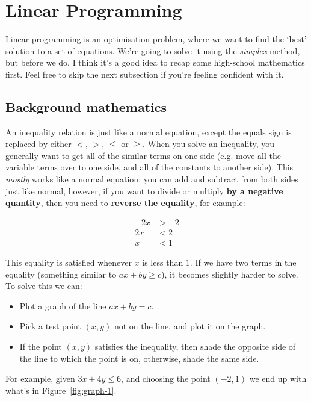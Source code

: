 \section{Linear Programming}

Linear programming is an optimisation problem, where we want to find the `best'
solution to a set of equations. We're going to solve it using the
\textit{simplex} method, but before we do, I think it's a good idea to recap
some high-school mathematics first. Feel free to skip the next subsection if
you're feeling confident with it.

\subsection{Background mathematics}

An inequality relation is just like a normal equation, except the equals sign is
replaced by either $<$, $>$, $\leq$ or $\geq$. When you solve an inequality, you
generally want to get all of the similar terms on one side (e.g. move all the
variable terms over to one side, and all of the constants to another side). This
\textit{mostly} works like a normal equation; you can add and subtract from both
sides just like normal, however, if you want to divide or multiply \textbf{by a
negative quantity}, then you need to \textbf{reverse the equality}, for example:

\[
  \begin{split}
    -2x &> -2\\
    2x &< 2\\
    x &< 1
  \end{split}
\]

This equality is satisfied whenever $x$ is less than $1$. If we have two terms
in the equality (something similar to $ax + by \geq c$), it becomes slightly
harder to solve. To solve this we can:

\begin{itemize}
  \item Plot a graph of the line $ax + by = c$.
  \item Pick a test point $(x, y)$ not on the line, and plot it on the graph.
  \item If the point $(x, y)$ satisfies the inequality, then shade the opposite 
    side of the line to which the point is on, otherwise, shade the same side.
\end{itemize}

For example, given $3x + 4y \leq 6$, and choosing the point $(-2,1)$ we end up
with what's in Figure~\ref{fig:graph-1}.

